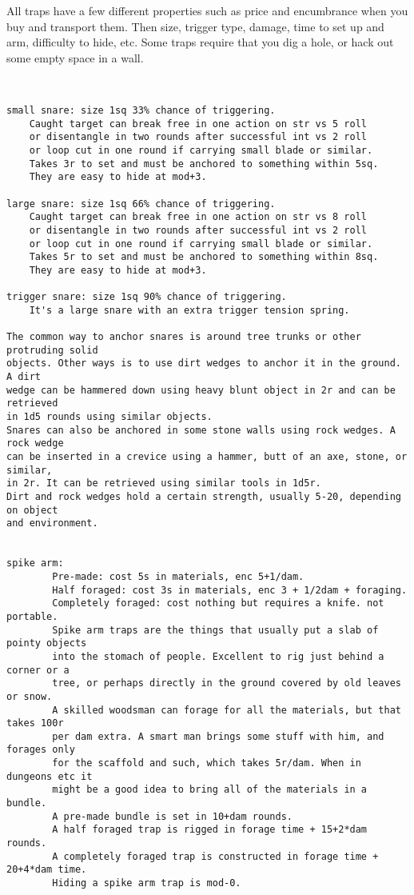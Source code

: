 All traps have a few different properties such as price and encumbrance when you buy and transport them. Then size, trigger type, damage, time to set up and arm, difficulty to hide, etc. Some traps require that you dig a hole, or hack out some empty space in a wall.

\

\small \begin{verbatim}
small snare: size 1sq 33% chance of triggering.
    Caught target can break free in one action on str vs 5 roll
    or disentangle in two rounds after successful int vs 2 roll
    or loop cut in one round if carrying small blade or similar.
    Takes 3r to set and must be anchored to something within 5sq.
    They are easy to hide at mod+3.

large snare: size 1sq 66% chance of triggering.
    Caught target can break free in one action on str vs 8 roll
    or disentangle in two rounds after successful int vs 2 roll
    or loop cut in one round if carrying small blade or similar.
    Takes 5r to set and must be anchored to something within 8sq.
    They are easy to hide at mod+3.

trigger snare: size 1sq 90% chance of triggering.
    It's a large snare with an extra trigger tension spring.

The common way to anchor snares is around tree trunks or other protruding solid
objects. Other ways is to use dirt wedges to anchor it in the ground. A dirt
wedge can be hammered down using heavy blunt object in 2r and can be retrieved
in 1d5 rounds using similar objects. 
Snares can also be anchored in some stone walls using rock wedges. A rock wedge
can be inserted in a crevice using a hammer, butt of an axe, stone, or similar,
in 2r. It can be retrieved using similar tools in 1d5r. 
Dirt and rock wedges hold a certain strength, usually 5-20, depending on object 
and environment.


spike arm:
        Pre-made: cost 5s in materials, enc 5+1/dam.
        Half foraged: cost 3s in materials, enc 3 + 1/2dam + foraging.
        Completely foraged: cost nothing but requires a knife. not portable.
        Spike arm traps are the things that usually put a slab of pointy objects
        into the stomach of people. Excellent to rig just behind a corner or a
        tree, or perhaps directly in the ground covered by old leaves or snow.
        A skilled woodsman can forage for all the materials, but that takes 100r
        per dam extra. A smart man brings some stuff with him, and forages only
        for the scaffold and such, which takes 5r/dam. When in dungeons etc it
        might be a good idea to bring all of the materials in a bundle.
        A pre-made bundle is set in 10+dam rounds.
        A half foraged trap is rigged in forage time + 15+2*dam rounds.
        A completely foraged trap is constructed in forage time + 20+4*dam time.
        Hiding a spike arm trap is mod-0.


\end{verbatim}
